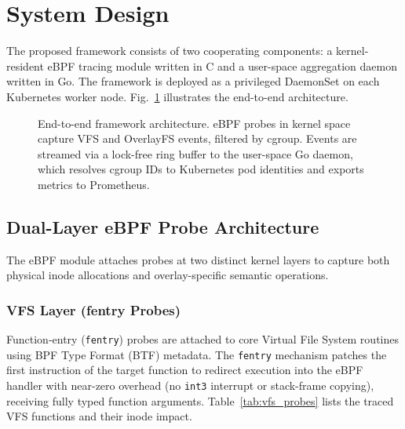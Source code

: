 \documentclass[conference]{IEEEtran}
\begin{document}
\section{System Design}
\label{sec:design}

The proposed framework consists of two cooperating components: a kernel-resident eBPF tracing module written in C and a user-space aggregation daemon written in Go. The framework is deployed as a privileged DaemonSet on each Kubernetes worker node. Fig.~\ref{fig:architecture} illustrates the end-to-end architecture.

\begin{figure}[t]
    \centering
    \caption{End-to-end framework architecture. eBPF probes in kernel space capture VFS and OverlayFS events, filtered by cgroup. Events are streamed via a lock-free ring buffer to the user-space Go daemon, which resolves cgroup IDs to Kubernetes pod identities and exports metrics to Prometheus.}
    \label{fig:architecture}
\end{figure}


\subsection{Dual-Layer eBPF Probe Architecture}
\label{subsec:probes}

The eBPF module attaches probes at two distinct kernel layers to capture both physical inode allocations and overlay-specific semantic operations.

\subsubsection{VFS Layer (fentry Probes)}
Function-entry (\texttt{fentry}) probes are attached to core Virtual File System routines using BPF Type Format (BTF) metadata. The \texttt{fentry} mechanism patches the first instruction of the target function to redirect execution into the eBPF handler with near-zero overhead (no \texttt{int3} interrupt or stack-frame copying), receiving fully typed function arguments. Table~\ref{tab:vfs_probes} lists the traced VFS functions and their inode impact.
\end{document}
